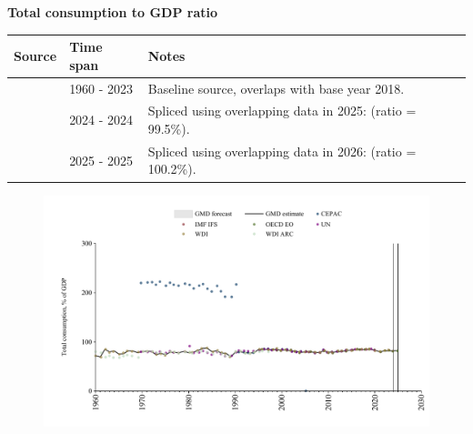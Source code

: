 \documentclass[12pt,a4paper,landscape]{article}
\begin{document}
\begin{adjustbox}{max totalsize={\paperwidth}{\paperheight},center}
\begin{minipage}[t][\textheight][t]{\textwidth}
\vspace*{0.5cm}
{}
\begin{center}
{\Large\bfseries Total consumption to GDP ratio}
\end{center}
\vspace{0.5cm}
\begin{table}[H]
\centering
\small
\begin{tabular}{|l|l|l|}
\hline
\textbf{Source} & \textbf{Time span} & \textbf{Notes} \\
\hline
\rowcolor{white}\cite{WDI}& 1960 - 2023 &Baseline source, overlaps with base year 2018. \\
\rowcolor{lightgray}\cite{IMF_IFS}& 2024 - 2024 &Spliced using overlapping data in 2025: (ratio = 99.5\%). \\
\rowcolor{white}\cite{OECD_EO}& 2025 - 2025 &Spliced using overlapping data in 2026: (ratio = 100.2\%). \\
\hline
\end{tabular}
\end{table}
\begin{figure}[H]
\centering
\includegraphics[width=\textwidth,height=0.6\textheight,keepaspectratio]{graphs/BRA_cons_GDP.pdf}
\end{figure}
\end{minipage}
\end{adjustbox}
\end{document}
